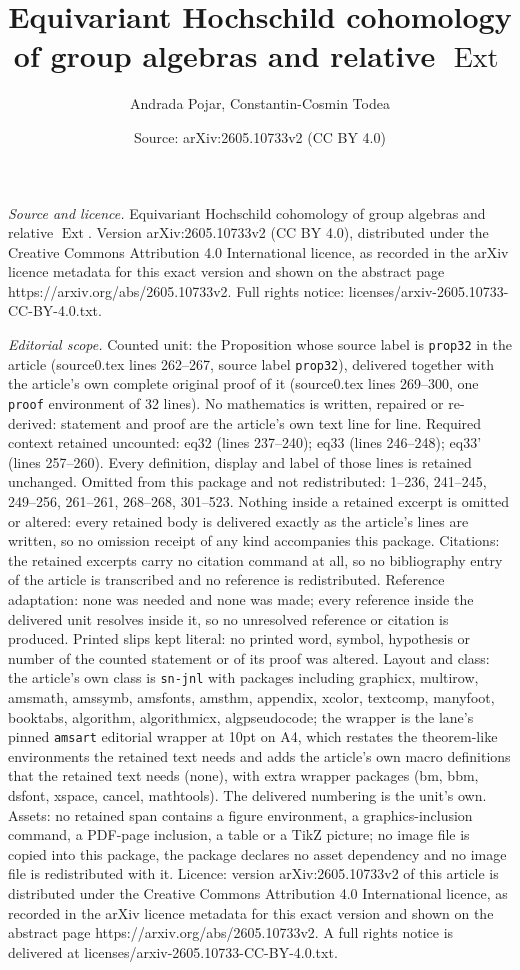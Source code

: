\documentclass[10pt,a4paper]{amsart}
\title[Equivariant Hochschild cohomology of group algebras and rela]{Equivariant Hochschild cohomology of group algebras and relative $\operatorname{Ext}$}
\author{Andrada Pojar, Constantin-Cosmin Todea}
\date{Source: arXiv:2605.10733v2 (CC BY 4.0)}
\begin{document}
\maketitle

\noindent\emph{Source and licence.} Equivariant Hochschild cohomology of group algebras and relative $\operatorname{Ext}$. Version arXiv:2605.10733v2 (CC BY 4.0), distributed under the Creative Commons Attribution 4.0 International licence, as recorded in the arXiv licence metadata for this exact version and shown on the abstract page https://arxiv.org/abs/2605.10733v2. Full rights notice: licenses/arxiv-2605.10733-CC-BY-4.0.txt.\par\smallskip

\noindent\textit{Editorial scope.} Counted unit: the Proposition whose source label is \texttt{prop32} in the article (source0.tex lines 262--267, source label \texttt{prop32}), delivered together with the article's own complete original proof of it (source0.tex lines 269--300, one \texttt{proof} environment of 32 lines). No mathematics is written, repaired or re-derived: statement and proof are the article's own text line for line. Required context retained uncounted: eq32 (lines 237--240); eq33 (lines 246--248); eq33' (lines 257--260). Every definition, display and label of those lines is retained unchanged. Omitted from this package and not redistributed: 1--236, 241--245, 249--256, 261--261, 268--268, 301--523. Nothing inside a retained excerpt is omitted or altered: every retained body is delivered exactly as the article's lines are written, so no omission receipt of any kind accompanies this package. Citations: the retained excerpts carry no citation command at all, so no bibliography entry of the article is transcribed and no reference is redistributed. Reference adaptation: none was needed and none was made; every reference inside the delivered unit resolves inside it, so no unresolved reference or citation is produced. Printed slips kept literal: no printed word, symbol, hypothesis or number of the counted statement or of its proof was altered. Layout and class: the article's own class is \texttt{sn-jnl} with packages including graphicx, multirow, amsmath, amssymb, amsfonts, amsthm, appendix, xcolor, textcomp, manyfoot, booktabs, algorithm, algorithmicx, algpseudocode; the wrapper is the lane's pinned \texttt{amsart} editorial wrapper at 10pt on A4, which restates the theorem-like environments the retained text needs and adds the article's own macro definitions that the retained text needs (none), with extra wrapper packages (bm, bbm, dsfont, xspace, cancel, mathtools). The delivered numbering is the unit's own. Assets: no retained span contains a figure environment, a graphics-inclusion command, a PDF-page inclusion, a table or a TikZ picture; no image file is copied into this package, the package declares no asset dependency and no image file is redistributed with it. Licence: version arXiv:2605.10733v2 of this article is distributed under the Creative Commons Attribution 4.0 International licence, as recorded in the arXiv licence metadata for this exact version and shown on the abstract page https://arxiv.org/abs/2605.10733v2. A full rights notice is delivered at licenses/arxiv-2605.10733-CC-BY-4.0.txt. 
\end{document}
